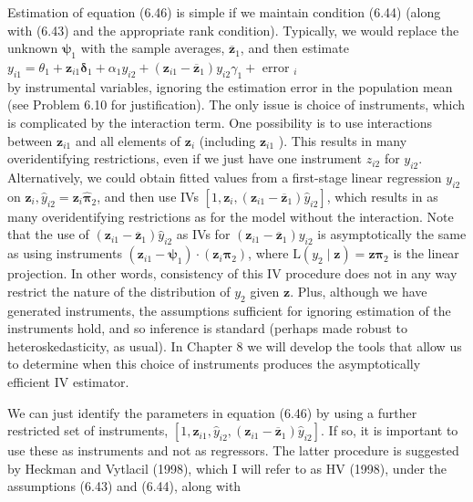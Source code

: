 \documentclass[10pt]{article}
\begin{document}
Estimation of equation (6.46) is simple if we maintain condition (6.44) (along with (6.43) and the appropriate rank condition). Typically, we would replace the unknown $\boldsymbol{\psi}_{1}$ with the sample averages, $\overline{\mathbf{z}}_{1}$, and then estimate\\
$y_{i 1}=\theta_{1}+\mathbf{z}_{i 1} \boldsymbol{\delta}_{1}+\alpha_{1} y_{i 2}+\left(\mathbf{z}_{i 1}-\overline{\mathbf{z}}_{1}\right) y_{i 2} \gamma_{1}+$ error $_{i}$\\
by instrumental variables, ignoring the estimation error in the population mean (see Problem 6.10 for justification). The only issue is choice of instruments, which is complicated by the interaction term. One possibility is to use interactions between $\mathbf{z}_{i 1}$ and all elements of $\mathbf{z}_{i}$ (including $\mathbf{z}_{i 1}$ ). This results in many overidentifying restrictions, even if we just have one instrument $z_{i 2}$ for $y_{i 2}$. Alternatively, we could obtain fitted values from a first-stage linear regression $y_{i 2}$ on $\mathbf{z}_{i}, \hat{y}_{i 2}=\mathbf{z}_{i} \hat{\boldsymbol{\pi}}_{2}$, and then use IVs $\left[1, \mathbf{z}_{i},\left(\mathbf{z}_{i 1}-\overline{\mathbf{z}}_{1}\right) \hat{y}_{i 2}\right]$, which results in as many overidentifying restrictions as for the model without the interaction. Note that the use of $\left(\mathbf{z}_{i 1}-\overline{\mathbf{z}}_{1}\right) \hat{y}_{i 2}$ as IVs for $\left(\mathbf{z}_{i 1}-\overline{\mathbf{z}}_{1}\right) y_{i 2}$ is asymptotically the same as using instruments $\left(\mathbf{z}_{i 1}-\boldsymbol{\psi}_{1}\right) \cdot\left(\mathbf{z}_{i} \boldsymbol{\pi}_{2}\right)$, where $\mathrm{L}\left(y_{2} \mid \mathbf{z}\right)=\mathbf{z} \boldsymbol{\pi}_{2}$ is the linear projection. In other words, consistency of this IV procedure does not in any way restrict the nature of the distribution of $y_{2}$ given $\mathbf{z}$. Plus, although we have generated instruments, the assumptions sufficient for ignoring estimation of the instruments hold, and so inference is standard (perhaps made robust to heteroskedasticity, as usual). In Chapter 8 we will develop the tools that allow us to determine when this choice of instruments produces the asymptotically efficient IV estimator.

We can just identify the parameters in equation (6.46) by using a further restricted set of instruments, $\left[1, \mathbf{z}_{i 1}, \hat{y}_{i 2},\left(\mathbf{z}_{i 1}-\overline{\mathbf{z}}_{1}\right) \hat{y}_{i 2}\right]$. If so, it is important to use these as instruments and not as regressors. The latter procedure is suggested by Heckman and Vytlacil (1998), which I will refer to as HV (1998), under the assumptions (6.43) and (6.44), along with
\end{document}
